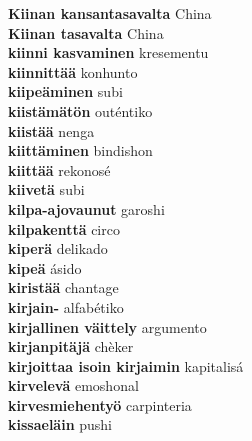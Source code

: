 \textbf{ Kiinan kansantasavalta  } China \\
\textbf{ Kiinan tasavalta  } China \\
\textbf{ kiinni kasvaminen  } kresementu \\
\textbf{ kiinnittää  } konhunto \\
\textbf{ kiipeäminen  } subi \\
\textbf{ kiistämätön  } outéntiko \\
\textbf{ kiistää  } nenga \\
\textbf{ kiittäminen  } bindishon \\
\textbf{ kiittää  } rekonosé \\
\textbf{ kiivetä  } subi \\
\textbf{ kilpa-ajovaunut  } garoshi \\
\textbf{ kilpakenttä  } circo \\
\textbf{ kiperä  } delikado \\
\textbf{ kipeä  } ásido \\
\textbf{ kiristää  } chantage \\
\textbf{ kirjain-  } alfabétiko \\
\textbf{ kirjallinen väittely  } argumento \\
\textbf{ kirjanpitäjä  } chèker \\
\textbf{ kirjoittaa isoin kirjaimin  } kapitalisá \\
\textbf{ kirvelevä  } emoshonal \\
\textbf{ kirvesmiehentyö  } carpinteria \\
\textbf{ kissaeläin  } pushi \\

